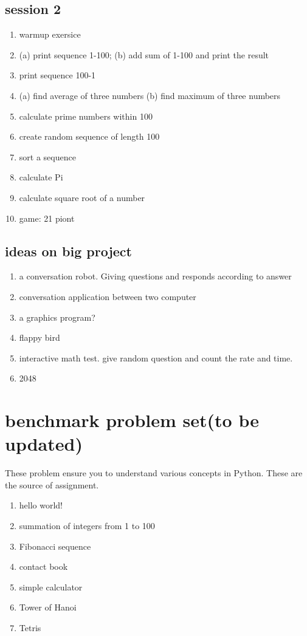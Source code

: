 \documentclass[aps,prb,12pt,tightenlines,%
notitlepage,longbibliography]{revtex4-1}
\begin{document}
\subsection{session 2}
\begin{enumerate}
\item
  warmup exersice
\item
  (a) print sequence 1-100;
  (b) add sum of 1-100 and print the result
\item
  print sequence 100-1
\item
  (a) find average of three numbers
  (b) find maximum of three numbers
\item
  calculate prime numbers within 100
\item
  create random sequence of length 100
\item
  sort a sequence
\item
  calculate Pi
\item
  calculate square root of a number
\item
  game: 21 piont
\end{enumerate}

\subsection{ideas on big project}
\begin{enumerate}
\item
  a conversation robot. Giving questions and responds according to
  answer
\item
  conversation application between two computer
\item
  a graphics program?
\item
  flappy bird
\item
  interactive math test. give random question and count the rate and time.
\item
  2048
\end{enumerate}

\section{benchmark problem set(to be updated)}
These problem ensure you to understand various concepts in
Python. These are the source of assignment.

\begin{enumerate}
\item hello world!
\item summation of integers from 1 to 100
\item Fibonacci sequence
\item contact book
\item simple calculator
\item Tower of Hanoi
\item Tetris  

\end{enumerate}
\end{document}
